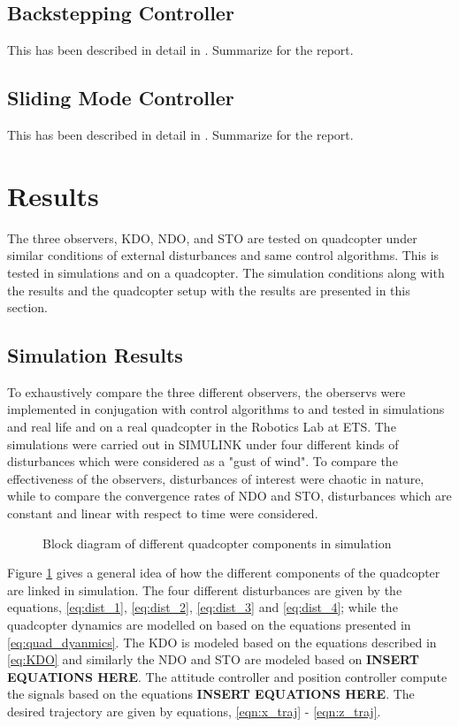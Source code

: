 \documentclass{article}
\begin{document}
\subsection{Backstepping Controller}
This has been described in detail in \cite{fethalla2017backstepping}. Summarize for the report.


\subsection{Sliding Mode Controller}
This has been described in detail in \cite{fethalla2018sliding}. Summarize for the report.





\section{Results}
The three observers, KDO, NDO, and STO are tested on quadcopter under similar conditions of external disturbances and same control algorithms. This is tested in simulations and on a quadcopter. The simulation conditions along with the results and the quadcopter setup with the results are presented in this section. 

\subsection{Simulation Results}
To exhaustively compare the three different observers, the oberservs were implemented in conjugation with control algorithms to and tested in simulations and real life and on a real quadcopter in the Robotics Lab at ETS. The simulations were carried out in SIMULINK under four different kinds of disturbances which were considered as a "gust of wind". To compare the effectiveness of the observers, disturbances of interest were chaotic in nature, while to compare the convergence rates of NDO and STO, disturbances which are constant and linear with respect to time were considered. 

\begin{figure}
	\centerline{}
	\caption{Block diagram of different quadcopter components in simulation}	
	\label{block_simulation}
\end{figure}
Figure \ref{block_simulation} gives a general idea of how the different components of the quadcopter are linked in simulation. The four different disturbances are given by the equations, \eqref{eq:dist_1}, \eqref{eq:dist_2}, \eqref{eq:dist_3} and \eqref{eq:dist_4}; while the quadcopter dynamics are modelled on based on the equations presented in \eqref{eq:quad_dyanmics}. The KDO is modeled based on the equations described in \eqref{eq:KDO} and similarly the NDO and STO are modeled based on \textbf{INSERT EQUATIONS HERE}. The attitude controller and position controller compute the signals based on the equations \textbf{INSERT EQUATIONS HERE}. The desired trajectory are given by equations, \eqref{eqn:x_traj} - \eqref{eqn:z_traj}. 
\end{document}

